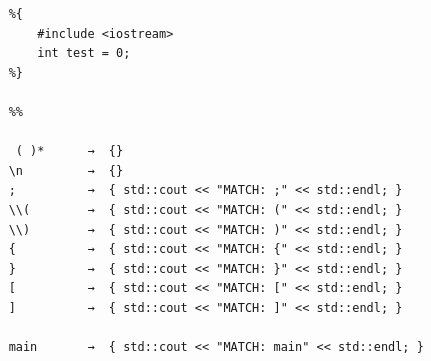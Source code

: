 \documentclass{article}
\begin{document}
\begin{lstlisting}
    %{
        #include <iostream>
        int test = 0;
    %}
    
    %%
    
     ( )*      →  {}
    \n         →  {}
    ;          →  { std::cout << "MATCH: ;" << std::endl; }
    \\(        →  { std::cout << "MATCH: (" << std::endl; }   
    \\)        →  { std::cout << "MATCH: )" << std::endl; }   
    {          →  { std::cout << "MATCH: {" << std::endl; }   
    }          →  { std::cout << "MATCH: }" << std::endl; }
    [          →  { std::cout << "MATCH: [" << std::endl; }   
    ]          →  { std::cout << "MATCH: ]" << std::endl; }
    
    main       →  { std::cout << "MATCH: main" << std::endl; }
    

\end{lstlisting}
\end{document}
